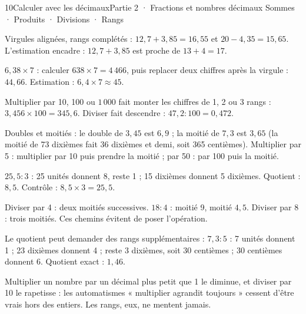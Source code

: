 \begin{ouverture}[calcul]{10}{Calculer avec les décimaux}{Partie 2 · Fractions et nombres décimaux}
{Sommes · Produits · Divisions · Rangs}
\end{ouverture}
\pagestyle{otMain}\essentiel\fontsize{11}{15}\selectfont
{}\label{cours-10-1}
\begin{savoirfaire}Virgules alignées, rangs complétés : $12{,}7+3{,}85=16{,}55$ et $20-4{,}35=15{,}65$. L’estimation encadre : $12{,}7+3{,}85$ est proche de $13+4=17$.\end{savoirfaire}
\begin{exemple}$6{,}38\times7$ : calculer $638\times7=4\,466$, puis replacer deux chiffres après la virgule : $44{,}66$. Estimation : $6{,}4\times7\approx45$.\end{exemple}
\begin{propriete}Multiplier par 10, 100 ou $1\,000$ fait monter les chiffres de 1, 2 ou 3 rangs : $3{,}456\times100=345{,}6$. Diviser fait descendre : $47{,}2:100=0{,}472$.\end{propriete}
\begin{savoirfaire}Doubles et moitiés : le double de $3{,}45$ est $6{,}9$ ; la moitié de $7{,}3$ est $3{,}65$ (la moitié de 73 dixièmes fait 36 dixièmes et demi, soit 365 centièmes). Multiplier par 5 : multiplier par 10 puis prendre la moitié ; par 50 : par 100 puis la moitié.\end{savoirfaire}
\clearpage
{}\label{cours-10-2}
\begin{exemple}$25{,}5:3$ : 25 unités donnent 8, reste 1 ; 15 dixièmes donnent 5 dixièmes. Quotient : $8{,}5$. Contrôle : $8{,}5\times3=25{,}5$.\end{exemple}
\begin{savoirfaire}Diviser par 4 : deux moitiés successives. $18:4$ : moitié 9, moitié $4{,}5$. Diviser par 8 : trois moitiés. Ces chemins évitent de poser l’opération.\end{savoirfaire}
\begin{propriete}Le quotient peut demander des rangs supplémentaires : $7{,}3:5$ : 7 unités donnent 1 ; 23 dixièmes donnent 4 ; reste 3 dixièmes, soit 30 centièmes ; 30 centièmes donnent 6. Quotient exact : $1{,}46$.\end{propriete}
\begin{attention}Multiplier un nombre par un décimal plus petit que 1 le diminue, et diviser par 10 le rapetisse : les automatismes « multiplier agrandit toujours » cessent d’être vrais hors des entiers. Les rangs, eux, ne mentent jamais.\end{attention}


